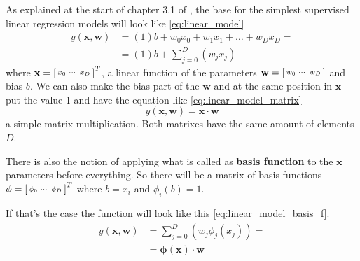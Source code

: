 \documentclass[a4paper,12pt]{article}
\theoremstyle{mytheoremstyle}
\theoremstyle{mytheoremstyle}
\theoremstyle{myproblemstyle}
\begin{document}
    As explained at the start of chapter 3.1 of \cite{bishop}, the base for the
    simplest supervised linear regression models will look like
    \eqref{eq:linear_model}
    \begin{equation}
        \begin{split}
            y(\mathbf{x}, \mathbf{w}) & = (1)b + w_{0}x_{0} + w_{1}x_{1} +
            \ldots + w_{D}x_{D} = \\ & = (1)b +
            \displaystyle\sum_{j=0}^{D}\left(w_{j}x_{j}\right)
        \end{split}
        \label{eq:linear_model}
    \end{equation}
    where $ \mathbf{x} =
    \begin{bsmallmatrix}x_{0}&\cdots&x_{D}\end{bsmallmatrix}^{T} $, a linear
    function of the parameters $ \mathbf{w} =
    \begin{bsmallmatrix}w_{0}&\cdots&w_{D}\end{bsmallmatrix} $ and bias $b$. We
    can also make the bias part of the $ \mathbf{w} $ and at the same position
    in $ \mathbf{x} $ put the value 1 and have the equation like
    \eqref{eq:linear_model_matrix}
    \begin{equation}
        y(\mathbf{x}, \mathbf{w}) = \mathbf{x}\cdot\mathbf{w}
        \label{eq:linear_model_matrix}
    \end{equation}
    a simple matrix multiplication. Both matrixes have the same amount of
    elements $ D $.

    There is also the notion of applying what is called as \textbf{basis
    function} to the $ \mathbf{x} $ parameters before everything. So there will
    be a matrix of basis functions $ \mathbf{\phi} =
    \begin{bsmallmatrix}\phi_{0}&\cdots&\phi_{D}\end{bsmallmatrix}^{T} $ where
    $ b = x_{i} $ and $ \phi_{i}(b) = 1 $.

    If that's the case the function will look like this
    \eqref{eq:linear_model_basis_f}.
    \begin{equation}
        \begin{split}
            y(\mathbf{x}, \mathbf{w}) & =
            \displaystyle\sum_{j=0}^{D}\left(w_{j}\phi_{j}(x_{j})\right) = \\
            & = \mathbf{\phi}\left(\mathbf{x}\right)\cdot\mathbf{w}
        \end{split}
        \label{eq:linear_model_basis_f}
    \end{equation}
\end{document}
